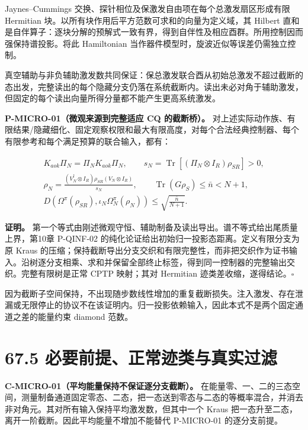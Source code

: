 \documentclass[
  11pt,
  oneside]{book}
\begin{document}
Jaynes--Cummings 交换、探针相位及保激发自由项在每个总激发扇区形成有限
Hermitian 块。以所有块作用后平方范数可求和的向量为定义域，其 Hilbert
直和是自伴算子：逐块分解的预解式一致有界，得到自伴性及相应酉群。所用控制因而强保持谱投影。将此
Hamiltonian 当作器件模型时，旋波近似等误差仍需独立控制。

真空辅助与非负辅助激发数共同保证：保总激发联合酉从初始总激发不超过截断的态出发，完整读出的每个隐藏分支仍落在系统截断内。读出未必对角于辅助激发，但固定的每个读出向量所得分量都不能产生更高系统激发。

\protect\hypertarget{p-micro-01}{}{}

\textbf{P-MICRO-01（微观来源到完整适应 CQ 的截断桥）。}
对上述实际动作族、有限结果/隐藏细化、固定观察权限和最大有限高度，对每个合法经典控制器、每个有限参考和每个满足预算的联合输入，都有：

\[
\begin{gathered}
K_{aok}\Pi_N=\Pi_NK_{aok}\Pi_N,\qquad
s_N=\operatorname{Tr}[(\Pi_N\otimes I_R)\rho_{SR}]>0,\\
\rho_N=\frac{(V_N^\dagger\otimes I_R)\rho_{SR}(V_N\otimes I_R)}{s_N},\qquad
\operatorname{Tr}(G\rho_S)\le\bar n<N+1,\\
D\!\left(\Omega^\pi(\rho_{SR}),\iota_N\Omega_N^\pi(\rho_N)\right)
\le\sqrt{\frac{\bar n}{N+1}}.
\end{gathered}
\]

\textbf{证明。}
第一个等式由刚述微观守恒、辅助制备及读出导出。谱不等式给出尾质量上界，第10章
P-QINF-02 的纯化论证给出初始归一投影态距离。定义有限分支为原 Kraus
的压缩；保持截断导出分支交织和有限完整性，而非把交织作为证书输入。沿树逐分支相乘、求和并保留全部终止标签，得到同一控制器的完整输出交织。完整有限树是正常
CPTP 映射；其对 Hermitian 迹类差收缩，遂得结论。\(\square\)

因为截断子空间保持，不出现随步数线性增加的重复截断损失。注入激发、存在泄漏或无限停止的协议不在该证明内。归一投影依赖输入，因此本式不是两个固定通道之差的能量约束
diamond 范数。

\section{67.5 必要前提、正常迹类与真实过滤}

\protect\hypertarget{c-micro-01}{}{}

\textbf{C-MICRO-01（平均能量保持不保证逐分支截断）。}
在能量零、一、二的三态空间，测量制备通道固定零态、二态，把一态送到零态与二态的等概率混合，并消去非对角元。其对所有输入保持平均激发数，但其中一个
Kraus 把一态升至二态，离开一阶截断。因此平均能量不增加不能替代
P-MICRO-01 的逐分支前提。
\end{document}
